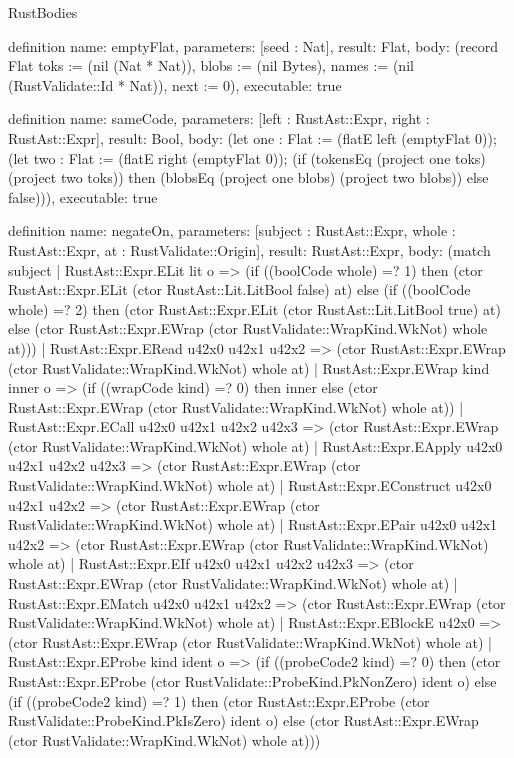 \begin{lexlean}{RustBodies}
\begin{semanticmodule}
definition{
  name: emptyFlat,
  parameters: [seed : Nat],
  result: Flat,
  body: (record Flat {toks := (nil (Nat * Nat)), blobs := (nil Bytes), names := (nil (RustValidate::Id * Nat)), next := 0}),
  executable: true
}

definition{
  name: sameCode,
  parameters: [left : RustAst::Expr, right : RustAst::Expr],
  result: Bool,
  body: (let one : Flat := (flatE left (emptyFlat 0)); (let two : Flat := (flatE right (emptyFlat 0)); (if (tokensEq (project one toks) (project two toks)) then (blobsEq (project one blobs) (project two blobs)) else false))),
  executable: true
}

definition{
  name: negateOn,
  parameters: [subject : RustAst::Expr, whole : RustAst::Expr, at : RustValidate::Origin],
  result: RustAst::Expr,
  body: (match subject
    | RustAst::Expr.ELit lit o => (if ((boolCode whole) =? 1) then (ctor RustAst::Expr.ELit (ctor RustAst::Lit.LitBool false) at) else (if ((boolCode whole) =? 2) then (ctor RustAst::Expr.ELit (ctor RustAst::Lit.LitBool true) at) else (ctor RustAst::Expr.EWrap (ctor RustValidate::WrapKind.WkNot) whole at)))
    | RustAst::Expr.ERead u42x0 u42x1 u42x2 => (ctor RustAst::Expr.EWrap (ctor RustValidate::WrapKind.WkNot) whole at)
    | RustAst::Expr.EWrap kind inner o => (if ((wrapCode kind) =? 0) then inner else (ctor RustAst::Expr.EWrap (ctor RustValidate::WrapKind.WkNot) whole at))
    | RustAst::Expr.ECall u42x0 u42x1 u42x2 u42x3 => (ctor RustAst::Expr.EWrap (ctor RustValidate::WrapKind.WkNot) whole at)
    | RustAst::Expr.EApply u42x0 u42x1 u42x2 u42x3 => (ctor RustAst::Expr.EWrap (ctor RustValidate::WrapKind.WkNot) whole at)
    | RustAst::Expr.EConstruct u42x0 u42x1 u42x2 => (ctor RustAst::Expr.EWrap (ctor RustValidate::WrapKind.WkNot) whole at)
    | RustAst::Expr.EPair u42x0 u42x1 u42x2 => (ctor RustAst::Expr.EWrap (ctor RustValidate::WrapKind.WkNot) whole at)
    | RustAst::Expr.EIf u42x0 u42x1 u42x2 u42x3 => (ctor RustAst::Expr.EWrap (ctor RustValidate::WrapKind.WkNot) whole at)
    | RustAst::Expr.EMatch u42x0 u42x1 u42x2 => (ctor RustAst::Expr.EWrap (ctor RustValidate::WrapKind.WkNot) whole at)
    | RustAst::Expr.EBlockE u42x0 => (ctor RustAst::Expr.EWrap (ctor RustValidate::WrapKind.WkNot) whole at)
    | RustAst::Expr.EProbe kind ident o => (if ((probeCode2 kind) =? 0) then (ctor RustAst::Expr.EProbe (ctor RustValidate::ProbeKind.PkNonZero) ident o) else (if ((probeCode2 kind) =? 1) then (ctor RustAst::Expr.EProbe (ctor RustValidate::ProbeKind.PkIsZero) ident o) else (ctor RustAst::Expr.EWrap (ctor RustValidate::WrapKind.WkNot) whole at)))
}
\end{semanticmodule}
\end{lexlean}

